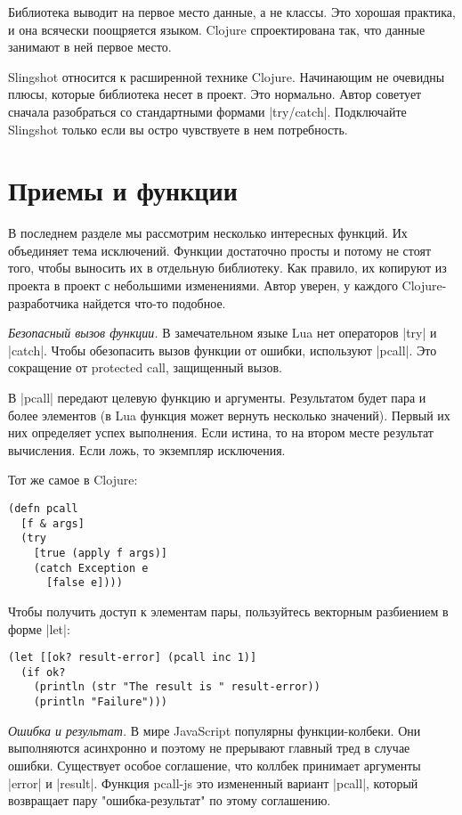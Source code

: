 Библиотека выводит на первое место данные, а не классы. Это хорошая практика, и
она всячески поощряется языком. Clojure спроектирована так, что данные занимают
в ней первое место.

Slingshot относится к расширенной технике Clojure. Начинающим не очевидны плюсы,
которые библиотека несет в проект. Это нормально. Автор советует сначала
разобраться со стандартными формами \spverb|try/catch|. Подключайте Slingshot только
если вы остро чувствуете в нем потребность.

\section{Приемы и функции}

В последнем разделе мы рассмотрим несколько интересных функций. Их объединяет
тема исключений. Функции достаточно просты и потому не стоят того, чтобы
выносить их в отдельную библиотеку. Как правило, их копируют из проекта в проект
с небольшими изменениями. Автор уверен, у каждого Clojure-разработчика найдется
что-то подобное.

\emph{Безопасный вызов функции.} В замечательном языке Lua нет операторов \spverb|try| и
\spverb|catch|. Чтобы обезопасить вызов функции от ошибки, используют \spverb|pcall|. Это
сокращение от protected call, защищенный вызов.

В \spverb|pcall| передают целевую функцию и аргументы. Результатом будет пара и более
элементов (в Lua функция может вернуть несколько значений). Первый их них
определяет успех выполнения. Если истина, то на втором месте результат
вычисления. Если ложь, то экземпляр исключения.

Тот же самое в Clojure:

\begin{verbatim}
(defn pcall
  [f & args]
  (try
    [true (apply f args)]
    (catch Exception e
      [false e])))
\end{verbatim}

Чтобы получить доступ к элементам пары, пользуйтесь векторным разбиением в форме
\spverb|let|:

\begin{verbatim}
(let [[ok? result-error] (pcall inc 1)]
  (if ok?
    (println (str "The result is " result-error))
    (println "Failure")))
\end{verbatim}

\emph{Ошибка и результат.} В мире JavaScript популярны функции-колбеки. Они
выполняются асинхронно и поэтому не прерывают главный тред в случае
ошибки. Существует особое соглашение, что коллбек принимает аргументы \spverb|error| и
\spverb|result|. Функция pcall-js это измененный вариант \spverb|pcall|, который возвращает
пару "ошибка-результат" по этому соглашению.

